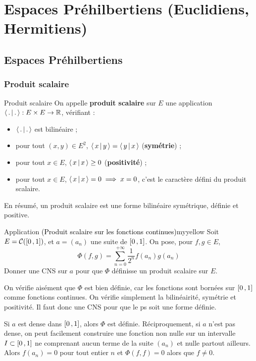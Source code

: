\section{Espaces Préhilbertiens (Euclidiens, Hermitiens)}

    \subsection{Espaces Préhilbertiens}

        \subsubsection{Produit scalaire}

        \begin{defi}{Produit scalaire}{}
            On appelle \textbf{produit scalaire} sur $E$ une application $\left<\,.\,\middle|\,.\,\right> : E \times E \to \mathbb{R}$, vérifiant :
            \begin{itemize}[label=\textcolor{myyellow}{--}]
                \item $\left<\,.\,\middle|\,.\,\right>$ est bilinéaire ;
                \item pour tout $(x,y) \in E^2$, $\left<\,x\,\middle|\,y\,\right> = \left<\,y\,\middle|\,x\,\right>$ (\textbf{symétrie}) ;
                \item pour tout $x \in E$, $\left<\,x\,\middle|\,x\,\right> \geq 0$ (\textbf{positivité}) ;
                \item pour tout $x \in E$, $\left<\,x\,\middle|\,x\,\right> = 0 \implies x = 0$, c’est le caractère défini du produit scalaire.
            \end{itemize}
            En résumé, un produit scalaire est une forme bilinéaire symétrique, définie et positive.
        \end{defi}

        \begin{omed}{Application \textcolor{black}{(Produit scalaire sur les fonctions continues)}}{myyellow}
            Soit $E = \mathcal{C}(\left[ 0 \, , 1 \right])$, et $a = (a_n)$ une suite de $\left[ 0 \, , 1 \right]$. On pose, pour $f,g \in E$,
            \[ \Phi(f,g) = \sum_{n=0}^{+\infty} \frac{1}{2^n} f(a_n) g(a_n) \]    
            Donner une CNS sur $a$ pour que $\Phi$ définisse un produit scalaire sur $E$.

            On vérifie aisément que $\Phi$ est bien définie, car les fonctions sont bornées sur $\left[ 0 \, , 1 \right]$ comme fonctions continues. On vérifie simplement la bilinéairité, symétrie et positivité. Il faut donc une CNS pour que le ps soit une forme définie. 

            Si $a$ est dense dans $\left[ 0 \, , 1 \right]$, alors $\Phi$ est définie. Réciproquement, si $a$ n’est pas dense, on peut facilement construire une fonction non nulle sur un intervalle $I \subset \left[ 0 \, , 1 \right]$ ne comprenant aucun terme de la suite $(a_n)$ et nulle partout ailleurs. Alors $f(a_n) = 0$ pour tout entier $n$ et $\Phi(f,f) = 0$ alors que $f \neq 0$.
        \end{omed}
    
